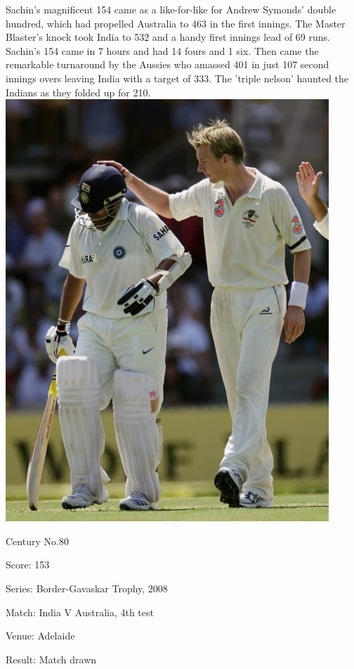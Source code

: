\documentclass[11pt, a4paper]{article}
\begin{document}
Sachin's magnificent 154 came as a like-for-like for Andrew Symonds' double hundred, which had propelled Australia to 463 in the first innings. The Master Blaster's knock took India to 532 and a handy first innings lead of 69 runs. Sachin's 154 came in 7 hours and had 14 fours and 1 six. Then came the remarkable turnaround by the Aussies who amassed 401 in just 107 second innings overs leaving India with a target of 333. The 'triple nelson' haunted the Indians as they folded up for 210.
\newpage
\includegraphics[height=0.7\textheight]{pics/80.jpg}

Century No.80 

Score: 153 

Series: Border-Gavaskar Trophy, 2008 

Match: India V Australia, 4th test 

Venue: Adelaide 

Result: Match drawn 
\end{document}
